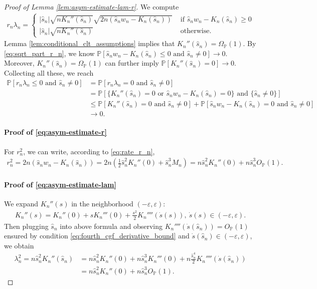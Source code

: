 \documentclass[12pt]{article}
\theoremstyle{definition}
\def\P{\mathbb{P}}
\def\P{\mathbb{P}}
\renewcommand{\P}{\mathbb{P}}							%
\begin{document}
\begin{proof}[Proof of Lemma \ref{lem:asym-estimate-lam-r}]
	We compute
	\begin{align*}
		r_n\lambda_n=
		\begin{cases}
			|\hat s_n|\sqrt{n K_n''(\hat s_n)}\sqrt{2n(\hat s_n w_n-K_n(\hat s_n))} & \text{ if }\hat s_n w_n-K_n(\hat s_n)\geq 0\\
			|\hat s_n|\sqrt{n K_n''(\hat s_n)} & \text{ otherwise.}
		\end{cases}
	\end{align*}
	Lemma \ref{lem:conditional_clt_assumptions} implies that $K_n''(\hat s_n)=\Omega_\P(1)$. By \eqref{eq:sqrt_part_r_n}, we know $\P[\hat s_n w_n-K_n(\hat s_n)\leq 0\text{ and }\hat s_n\neq 0]\rightarrow0$. Moreover, $K_n''(\hat s_n)=\Omega_{\P}(1)$ can further imply $\P[K_n''(\hat s_n)=0]\rightarrow0$. Collecting all these, we reach
	\begin{align*}
		\P[r_n\lambda_n\leq 0\text{ and }\hat s_n\neq 0]
		&
		=\P[r_n\lambda_n= 0\text{ and }\hat s_n\neq 0]\\
		&
		= \P[\{K_n''(\hat s_n)=0\text{ or }\hat s_nw_n-K_n(\hat s_n)=0\}\text{ and }\{\hat s_n \neq 0\}]\\
		&
		\leq \P[K_n''(\hat s_n)=0 \text{ and }\hat s_n\neq 0]+\P[\hat s_n w_n-K_n(\hat s_n)=0\text{ and }\hat s_n\neq 0]\\
		&
		\rightarrow0.
	\end{align*}

	\paragraph{Proof of \eqref{eq:asym-estimate-r}}

	For $r^2_n$, we can write, according to \eqref{eq:rate_r_n},
	\begin{align}\label{eq:r_n_formula}
		r_n^2=2n(\hat s_n w_n-K_n(\hat s_n))=2n\left(\frac{1}{2}\hat s_n^2K_n''(0)+\hat s_n^3M_n\right)=n\hat s_n^2K_n''(0)+n\hat s_n^3O_{\P}(1).
	\end{align}

	\paragraph{Proof of \eqref{eq:asym-estimate-lam}}

	We expand $K_n''(s)$ in the neighborhood $(-\varepsilon,\varepsilon)$:
	\begin{align*}
	  K_n''(s)=K_n''(0)+sK_n'''(0)+\frac{s^2}{2}K_n''''(\dot s(s)),\ \dot s(s)\in (-\varepsilon,\varepsilon).
	\end{align*}
	Then plugging $\hat s_n$ into above formula and observing $K_n''''(\dot s(\hat s_n))=O_{\P}(1)$ ensured by condition \eqref{eq:fourth_cgf_derivative_bound} and $\dot s(\hat s_n)\in (-\varepsilon,\varepsilon)$, we obtain 
	\begin{align}
		\lambda_n^2=n\hat s_n^2 K_n''(\hat s_n)
		&\nonumber
		=n\hat s_n^2 K_n''(0)+n\hat s_n^3 K_n'''(0)+n\frac{\hat s_n^4}{2}K_n''''(\dot s(\hat s_n))\\
		&\label{eq:lam_n_formula}
		=n\hat s_n^2 K_n''(0)+n\hat s_n^3 O_{\P}(1).
	\end{align}


\end{proof}
\end{document}
